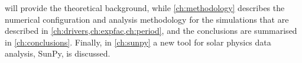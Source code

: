  will provide the theoretical background, while \cref{ch:methodology} describes the numerical configuration and analysis methodology for the simulations that are described in \cref{ch:drivers,ch:expfac,ch:period}, and the conclusions are summarised in \cref{ch:conclusions}.
Finally, in \cref{ch:sunpy} a new tool for solar physics data analysis, SunPy, is discussed.
